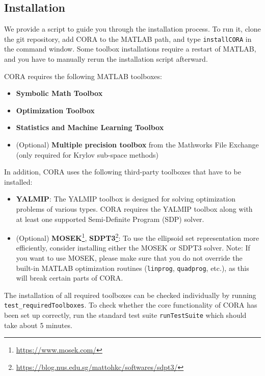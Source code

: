 \subsection{Installation}\label{sec:installation}

We provide a script to guide you through the installation process.
To run it, clone the git repository, add CORA to the MATLAB path, and type \texttt{installCORA} in the command window.
Some toolbox installations require a restart of MATLAB, and you have to manually rerun the installation script afterward.

CORA requires the following MATLAB toolboxes:
\begin{itemize}
	\item \textbf{Symbolic Math Toolbox}
	\item \textbf{Optimization Toolbox}
	\item \textbf{Statistics and Machine Learning Toolbox}
	\item (Optional) \textbf{Multiple precision toolbox} from the Mathworks File Exchange (only required for Krylov sub-space methods)
\end{itemize}

In addition, CORA uses the following third-party toolboxes that have to be installed:
\begin{itemize}
	\item \textbf{YALMIP}: The YALMIP toolbox \cite{Lofberg2004} is designed for solving optimization problems of various types.
		CORA requires the YALMIP toolbox along with at least one supported Semi-Definite Program (SDP) solver.
	\item (Optional) \textbf{MOSEK}\footnote{\url{https://www.mosek.com/}}, \textbf{SDPT3}\footnote{\url{https://blog.nus.edu.sg/mattohkc/softwares/sdpt3/}}: To use the ellipsoid set representation more efficiently, consider installing either the MOSEK or SDPT3 solver. Note: If you want to use MOSEK, please make sure that you do not override the built-in MATLAB optimization routines (\texttt{linprog}, \texttt{quadprog}, etc.), as this will break certain parts of CORA.
\end{itemize}

The installation of all required toolboxes can be checked individually by running \newline \texttt{test\_requiredToolboxes}.
To check whether the core functionality of CORA has been set up correctly, run the standard test suite \texttt{runTestSuite} which should take about 5 minutes.

